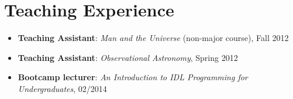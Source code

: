 \documentclass[11pt,letterpaper,roman]{moderncv}        %
\begin{document}
\begin{itemize}
\end{itemize}

\section{Teaching Experience}
\begin{itemize}
\setlength\itemsep{0.0em}
\item {\bfseries Teaching Assistant}: \textit{Man and the Universe} (non-major course), Fall 2012 %
\item {\bfseries Teaching Assistant}: \textit{Observational Astronomy}, Spring 2012 %
\item {\bfseries Bootcamp lecturer}: \textit{An Introduction to IDL Programming for Undergraduates}, 02/2014 %
\end{itemize}
\end{document}

